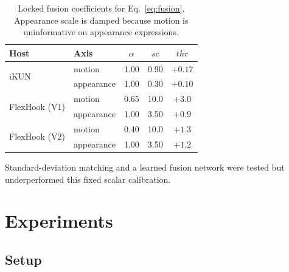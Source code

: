 \documentclass[sigconf,review,anonymous]{acmart}
\begin{document}
\begin{table}[t]
\centering
\caption{Locked fusion coefficients for Eq.~\ref{eq:fusion}. Appearance scale is damped because motion is uninformative on appearance expressions.}
\label{tab:recipe}
\small
\begin{tabular}{llccc}
\toprule
Host & Axis & $\alpha$ & $\mathit{sc}$ & $\mathit{thr}$ \\
\midrule
\multirow{2}{*}{iKUN}        & motion     & 1.00 & 0.90 & $+0.17$ \\
                             & appearance & 1.00 & 0.30 & $+0.10$ \\
\midrule
\multirow{2}{*}{FlexHook (V1)} & motion     & 0.65 & 10.0 & $+3.0$  \\
                             & appearance & 1.00 & 3.50 & $+0.9$  \\
\midrule
\multirow{2}{*}{FlexHook (V2)} & motion     & 0.40 & 10.0 & $+1.3$  \\
                             & appearance & 1.00 & 3.50 & $+1.2$  \\
\bottomrule
\end{tabular}
\end{table}

Standard-deviation matching and a learned fusion network were tested but underperformed this fixed scalar calibration.

\section{Experiments}
\label{sec:exp}

\subsection{Setup}
\label{sec:setup}
\end{document}
